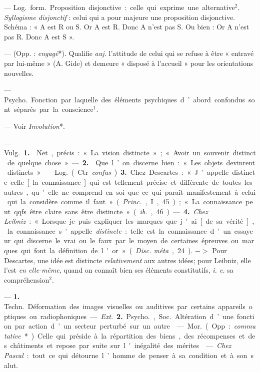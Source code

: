 \begin{itemize}[leftmargin=1cm, label=, itemsep=1pt]
 — \si{Log.} \si{form.} Proposition
disjonctive : celle qui exprime une
alternative$^2$. {\it Syllogisme disjonctif} :
celui qui a pour majeure une proposition disjonctive. Schéma : « A
est R ou S. Or A est R. Donc A n'est
pas S. Ou bien : Or A n’est pas R.
Donc A est S ».

 — (Opp. : {\it engagé}*). Qualifie {\it auj.} l'attitude de
celui qui se refuse à être « entravé par lui-même » (A. Gide) et demeure «
disposé à l'accueil » pour les orientations nouvelles.

 — \si{Psycho.} Fonction par
laquelle des éléments psychiques
d’abord confondus sont séparés par
la conscience$^1$.

 — Voir {\it Involution}*.

 — \si{Vulg.} {\bf 1.}  Net, précis :
« La vision distincte » ; « Avoir un
souvenir distinct de quelque chose ».
— {\bf 2.}  Que l’on discerne bien :
« Les objets devinrent distincts ».

— \si{Log.} (Ctr. {\it confus}) {\bf 3.} Chez
Descartes : « J’appelle distincte celle
[la connaissance] qui est tellement
précise et différente de toutes les
autres, qu'elle ne comprend en soi
que ce qui paraît manifestement à
celui qui la considère comme il faut »
({\it Princ.}, I, 45); « La connaissance
peut qqfs. être claire sans être distincte » ({\it ib.}, 46). — {\bf 4.} {\it Chez Leibniz} :
« Lorsque je puis expliquer les marques que j'ai [de sa vérité], la connaissance s’appelle {\it distincte} : telle
est la connaissance d’un essayeur
qui discerne le vrai ou le faux par
le moyen de certaines épreuves ou
marques qui font la définition de
l'or » ({\it Disc. méta}, 24). $->$ Pour
Descartes, une idée est distincte
{\it relativement} aux autres idées; pour
Leibniz, elle l’est {\it en elle-même},
quand on connaît bien ses éléments
constitutifs, {\it i. e.} sa compréhension$^2$.

 — {\bf 1.} \si{Techn.} Déformation
des images visuelles ou auditives par
certains appareils optiques ou radiophoniques. — {\it Ext.} {\bf 2.} \si{Psycho.}, \si{Soc.}
Altération d’une fonction par action
d’un secteur perturbé sur un autre.

 — \si{Mor.} (Opp. :
{\it commutative}*). Celle qui préside à la
répartition des biens, des récompenses et des châtiments et repose
par suite sur l'inégalité des mérites.

 — {\it Chez Pascal} :
tout ce qui détourne l’homme de
penser à sa condition et à son salut.


\end{itemize}
